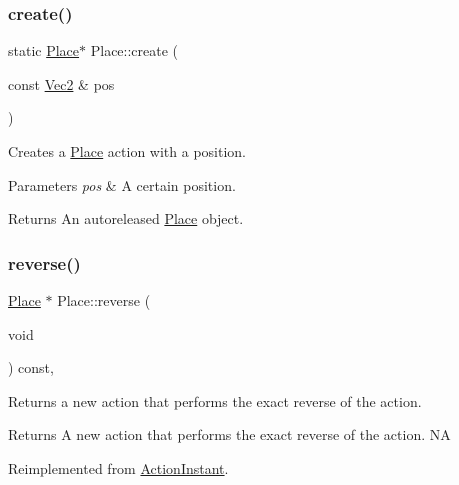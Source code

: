 \subsubsection{\texorpdfstring{create()}{create()}\hspace{0.1cm}{\footnotesize\ttfamily [2/2]}}
{\footnotesize\ttfamily static \hyperlink{classPlace}{Place}$\ast$ Place\+::create (\begin{DoxyParamCaption}\item[{const \hyperlink{classVec2}{Vec2} \&}]{pos }\end{DoxyParamCaption})\hspace{0.3cm}{\ttfamily [static]}}

Creates a \hyperlink{classPlace}{Place} action with a position.


\begin{DoxyParams}{Parameters}
{\em pos} & A certain position. \\
\hline
\end{DoxyParams}
\begin{DoxyReturn}{Returns}
An autoreleased \hyperlink{classPlace}{Place} object. 
\end{DoxyReturn}
\mbox{\label{classPlace_aea55a3981ebe1aa3ad8fd4cd7bf26337}} 
\subsubsection{\texorpdfstring{reverse()}{reverse()}\hspace{0.1cm}{\footnotesize\ttfamily [1/2]}}
{\footnotesize\ttfamily \hyperlink{classPlace}{Place} $\ast$ Place\+::reverse (\begin{DoxyParamCaption}\item[{void}]{ }\end{DoxyParamCaption}) const\hspace{0.3cm}{\ttfamily [override]}, {\ttfamily [virtual]}}

Returns a new action that performs the exact reverse of the action.

\begin{DoxyReturn}{Returns}
A new action that performs the exact reverse of the action.  NA 
\end{DoxyReturn}


Reimplemented from \hyperlink{classActionInstant_aeb1870802c509e1f4111c863a28e9262}{Action\+Instant}.

